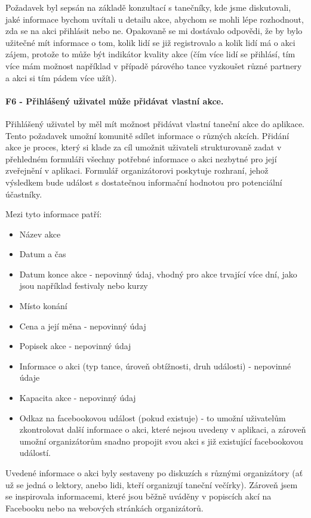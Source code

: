 Požadavek byl sepsán na základě konzultací s tanečníky, kde jsme diskutovali, jaké informace bychom uvítali u detailu akce, abychom se mohli lépe rozhodnout, zda se na akci přihlásit nebo ne. Opakovaně se mi dostávalo odpovědi, že by bylo užitečné mít informace o tom, kolik lidí se již registrovalo a kolik lidí má o akci zájem, protože to může být indikátor kvality akce (čím více lidí se přihlásí, tím více mám možnost například v případě párového tance vyzkoušet různé partnery a akci si tím pádem více užít). 

\paragraph{F6 - Přihlášený uživatel může přidávat vlastní akce.}\label{req:F6}
Přihlášený uživatel by měl mít možnost přidávat vlastní taneční akce do aplikace. Tento požadavek umožní komunitě sdílet informace o různých akcích. Přidání akce je proces, který si klade za cíl umožnit uživateli strukturovaně zadat v přehledném formuláři všechny potřebné informace o akci nezbytné pro její zveřejnění v aplikaci. Formulář organizátorovi poskytuje rozhraní, jehož výsledkem bude událost s dostatečnou informační hodnotou pro potenciální účastníky.

Mezi tyto informace patří:
\begin{itemize}
    \item Název akce
    \item Datum a čas
    \item Datum konce akce - nepovinný údaj, vhodný pro akce trvající více dní, jako jsou například festivaly nebo kurzy
    \item Místo konání
    \item Cena a její měna - nepovinný údaj
    \item Popisek akce - nepovinný údaj
    \item Informace o akci (typ tance, úroveň obtížnosti, druh události) - nepovinné údaje
    \item Kapacita akce - nepovinný údaj
    \item Odkaz na facebookovou událost (pokud existuje) - to umožní uživatelům zkontrolovat další informace o akci, které nejsou uvedeny v aplikaci, a zároveň umožní organizátorům snadno propojit svou akci s již existující facebookovou událostí.
\end{itemize}
Uvedené informace o akci byly sestaveny po diskuzích s různými organizátory (ať už se jedná o lektory, anebo lidi, kteří organizují taneční večírky). Zároveň jsem se inspirovala informacemi, které jsou běžně uváděny v popiscích akcí na Facebooku nebo na webových stránkách organizátorů.

